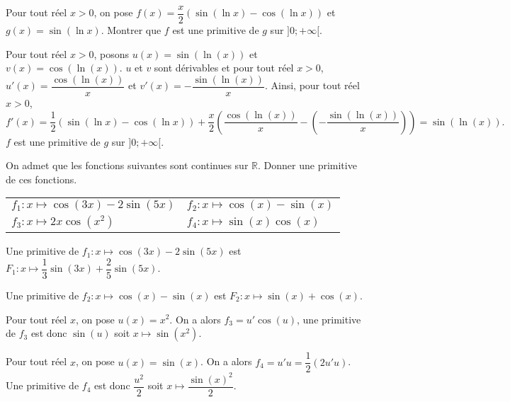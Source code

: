 \documentclass[11pt,fleqn, openany]{book} %
\begin{document}
\begin{exercise}Pour tout réel $x>0$, on pose $f(x)=\dfrac{x}{2}\left(\sin(\ln x)-\cos(\ln x)\right)$ et $g(x)=\sin(\ln x)$. Montrer que $f$ est une primitive de $g$ sur $]0;+\infty[$.\end{exercise}

\begin{solution}Pour tout réel $x>0$, posons $u(x)=\sin(\ln(x))$ et $v(x)=\cos(\ln(x))$. $u$ et $v$ sont dérivables et pour tout réel $x>0$, $u'(x)=\dfrac{\cos(\ln(x))}{x}$ et $v'(x)=-\dfrac{\sin(\ln(x))}{x}$. Ainsi, pour tout réel $x>0$,
\[f'(x)=\dfrac{1}{2}(\sin(\ln x)-\cos(\ln x))+\dfrac{x}{2}\left(\dfrac{\cos(\ln(x))}{x} -\left(-\dfrac{\sin(\ln(x))}{x}\right)\right)=\sin(\ln(x)).\]
$f$ est une primitive de $g$ sur $]0;+\infty[$.

\end{solution}




\begin{exercise}On admet que les fonctions suivantes sont continues sur $\mathbb{R}$. Donner une primitive de ces fonctions.
\renewcommand{\arraystretch}{1}

\begin{tabularx}{\linewidth}{XX}
$f_1:x\mapsto \cos(3x)-2\sin(5x)$
& $f_2:x\mapsto \cos(x)-\sin(x)$ \\
 $f_3:x \mapsto 2x\cos(x^2)$
& $f_4:x \mapsto\sin(x)\cos(x)$ \\
\end{tabularx}
\end{exercise}

\begin{solution}

Une primitive de $f_1:x\mapsto \cos(3x)-2\sin(5x)$ est $F_1:x \mapsto \dfrac{1}{3}\sin(3x)+\dfrac{2}{5}\sin(5x)$.

Une primitive de $f_2:x\mapsto \cos(x)-\sin(x)$ est $F_2:x \mapsto \sin(x) + \cos(x)$.

Pour tout réel $x$, on pose $u(x)=x^2$. On a alors $f_3 = u'\cos(u)$, une primitive de $f_3$ est donc $\sin(u)$ soit $x\mapsto \sin(x^2)$.

Pour tout réel $x$, on pose $u(x)=\sin(x)$. On a alors $f_4=u'u = \dfrac{1}{2} (2u'u)$.\\ Une primitive de $f_4$ est donc $\dfrac{u^2}{2}$ soit $x\mapsto \dfrac{\sin(x)^2}{2}$.

\end{solution}
\end{document}
